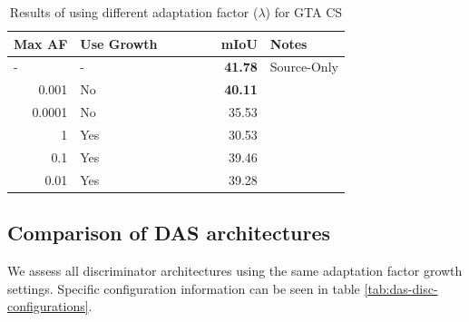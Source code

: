 \documentclass[a4paper,12pt]{report}
\begin{document}
\begin{table}[]
    \centering
    \begin{tabular}{|r|l|r|l|}
        \hline
        \multicolumn{1}{|l|}{Max AF} & Use Growth & \multicolumn{1}{l|}{\ \ \ \ \ \ \ mIoU} & Notes       \\ \hline
        \multicolumn{1}{|l|}{-}      & -          & \textbf{41.78}                          & Source-Only \\ \hline
        0.001                        & No         & \textbf{40.11}                          &             \\ \hline
        0.0001                       & No         & 35.53                                   &             \\ \hline
        1                            & Yes        & 30.53                                   &             \\ \hline
        0.1                          & Yes        & 39.46                                   &             \\ \hline
        0.01                         & Yes        & 39.28                                   &             \\ \hline
    \end{tabular}
    \caption{Results of using different adaptation factor ($\lambda$) for GTA \textrightarrow CS}
\end{table}

\subsection{Comparison of DAS architectures}

We assess all discriminator architectures using the same adaptation factor growth settings. Specific configuration information can be seen in table \ref{tab:das-disc-configurations}.
\end{document}
